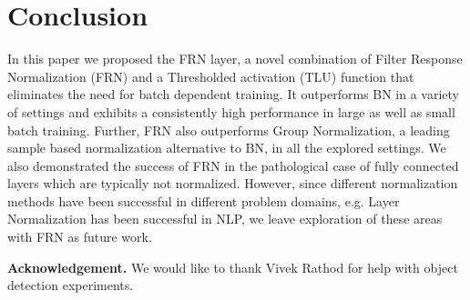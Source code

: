 \documentclass[10pt,twocolumn,letterpaper]{article}
\newcommand{\orelu}{TLU}
\newcommand{\papername}{FRN}
\newcommand{\batchnorm}{BN}
\newcommand{\momentnorm}{FRN}
\begin{document}
\section{Conclusion}

In this paper we proposed the \papername{} layer, a novel combination of Filter Response Normalization (\momentnorm{}) and a Thresholded activation (\orelu{}) function that eliminates the need for batch dependent training. It outperforms \batchnorm{} in a variety of settings and exhibits a consistently high performance in large as well as small batch training. Further, \papername{} also outperforms Group Normalization, a leading sample based normalization alternative to \batchnorm{}, in all the explored settings. We also demonstrated the success of \papername{} in the pathological case of fully connected layers which are typically not normalized. However, since different normalization methods have been successful in different problem domains, e.g. Layer Normalization has been successful in NLP, we leave exploration of these areas with \papername{} as future work.


{\small
\medskip
\noindent\textbf{Acknowledgement.} We would like to thank Vivek Rathod for help with object detection experiments.


\setlength{\bibsep}{0pt}


}
\end{document}
